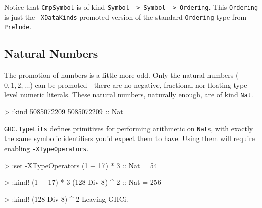 \documentclass[
  11pt,
]{book}
\newenvironment{Shaded}{}{}
\newcommand{\DataTypeTok}[1]{\textcolor[rgb]{0.56,0.13,0.00}{#1}}
\newcommand{\DecValTok}[1]{\textcolor[rgb]{0.25,0.63,0.44}{#1}}
\newcommand{\NormalTok}[1]{#1}
\newcommand{\OperatorTok}[1]{\textcolor[rgb]{0.40,0.40,0.40}{#1}}
\newcommand{\OtherTok}[1]{\textcolor[rgb]{0.00,0.44,0.13}{#1}}
\theoremstyle{nonumberplain}
\begin{document}
Notice that \texttt{CmpSymbol} is of kind
\texttt{Symbol\ -\textgreater{}\ Symbol\ -\textgreater{}\ Ordering}.
This \texttt{Ordering} is just the \texttt{-XDataKinds} promoted version
of the standard \texttt{Ordering} type from \texttt{Prelude}.

\hypertarget{natural-numbers}{%
\subsection{Natural Numbers}\label{natural-numbers}}

The promotion of numbers is a little more odd. Only the natural numbers
(\(0, 1, 2, \ldots\)) can be promoted---there are no negative,
fractional nor floating type-level numeric literals. These natural
numbers, naturally enough, are of kind \texttt{Nat}.

\begin{Shaded}
\begin{Highlighting}[]
\OperatorTok{\textgreater{}} \OperatorTok{:}\NormalTok{kind }\DecValTok{5085072209}
\DecValTok{5085072209}\OtherTok{ ::} \DataTypeTok{Nat}
\end{Highlighting}
\end{Shaded}

\texttt{GHC.TypeLits} defines primitives for performing arithmetic on
\texttt{Nat}s, with exactly the same symbolic identifiers you'd expect
them to have. Using them will require enabling \texttt{-XTypeOperators}.

\begin{Shaded}
\begin{Highlighting}[]
\OperatorTok{\textgreater{}} \OperatorTok{:}\NormalTok{set }\OperatorTok{{-}}\DataTypeTok{XTypeOperators}
\NormalTok{(}\DecValTok{1} \OperatorTok{+} \DecValTok{17}\NormalTok{) }\OperatorTok{*} \DecValTok{3}\OtherTok{ ::} \DataTypeTok{Nat}
\OtherTok{=} \DecValTok{54}


\OperatorTok{\textgreater{}} \OperatorTok{:}\NormalTok{kind}\OperatorTok{!}\NormalTok{ (}\DecValTok{1} \OperatorTok{+} \DecValTok{17}\NormalTok{) }\OperatorTok{*} \DecValTok{3}
\NormalTok{(}\DecValTok{128} \OtherTok{\textasciigrave{}Div\textasciigrave{}} \DecValTok{8}\NormalTok{) }\OperatorTok{\^{}} \DecValTok{2}\OtherTok{ ::} \DataTypeTok{Nat}
\OtherTok{=} \DecValTok{256}


\OperatorTok{\textgreater{}} \OperatorTok{:}\NormalTok{kind}\OperatorTok{!}\NormalTok{ (}\DecValTok{128} \OtherTok{\textasciigrave{}Div\textasciigrave{}} \DecValTok{8}\NormalTok{) }\OperatorTok{\^{}} \DecValTok{2}
\DataTypeTok{Leaving} \DataTypeTok{GHCi}\OperatorTok{.}
\end{Highlighting}
\end{Shaded}
\end{document}
